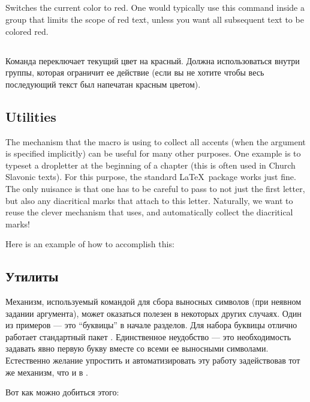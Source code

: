 \begin{EN}

\subsection{}
Switches the current color to red. One would typically use this command
inside a group that limits the scope of red text, unless
you want all subsequent text to be colored red.
\end{EN}

\begin{RU}

\subsection{}
Команда переключает текущий цвет на красный. Должна использоваться
внутри группы, которая ограничит ее действие (если вы не хотите
чтобы весь последующий текст был напечатан красным цветом).
\end{RU}

\begin{EN}
\section{Utilities}
The mechanism that the  macro is using to collect all accents
(when the argument is specified implicitly) can be useful for
many other purposes. One example is to typeset a dropletter at the beginning of a chapter
(this is often used in Church Slavonic texts). For this purpose, the standard \LaTeX\ package
 works just fine. The only nuisance is that one has to be careful to
pass to  not just the first letter, but also any diacritical marks that
attach to this letter. Naturally, we want to reuse the
clever mechanism that  uses, and automatically collect the diacritical marks!

Here is an example of how to accomplish this:
\end{EN}

\begin{RU}
\section{Утилиты}
Механизм, используемый командой  для сбора выносных символов (при неявном задании аргумента), может оказаться полезен
в некоторых других случаях. Один из примеров --- это ``буквицы'' в начале разделов. Для набора буквицы отлично работает стандартный
пакет . Единственное неудобство --- это необходимость задавать явно первую букву вместе со всеми ее выносными символами.
Естественно желание упростить и автоматизировать эту работу задействовав тот же механизм, что и в .

Вот как можно добиться этого:
\end{RU}

